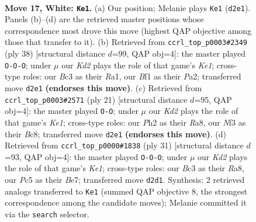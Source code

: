 \documentclass[11pt]{article}
\begin{document}
\clearpage

\begin{figure}[p]\centering
\begin{subfigure}{0.46\textwidth}\centering
\resizebox{\linewidth}{!}{%
\newchessgame
\chessboard[
  setfen={r1b2r2/p1ppqp2/2n1p2k/1QP3pp/4n3/2B2NP1/PP1KPP1P/R4B1R w - - 1 17},
  showmover=false,
  pgfstyle=straightmove, color=movearrow, markmove={d2-e1}
]}
\caption{}
\end{subfigure}\hfill
\begin{subfigure}{0.46\textwidth}\centering
\resizebox{\linewidth}{!}{%
\newchessgame
\chessboard[
  setfen={r1bqk2r/p1p5/3p1pn1/2pPp1n1/2P1P1Pp/2N2P1N/PP1QB2R/R3K3 w Qkq - 2 20},
  showmover=false,
  pgfstyle=straightmove, color=movearrow, markmove={e1-c1}
]}
\caption{}
\end{subfigure}
\\[4pt]
\begin{subfigure}{0.46\textwidth}\centering
\resizebox{\linewidth}{!}{%
\newchessgame
\chessboard[
  setfen={r1b1k2r/ppq1bppp/2p2n2/P3p1N1/2p1P3/2NP3P/1PP2PP1/R1BQ1RK1 b kq - 3 11},
  showmover=false,
  pgfstyle=straightmove, color=movearrow, markmove={e8-g8}
]}
\caption{}
\end{subfigure}\hfill
\begin{subfigure}{0.46\textwidth}\centering
\resizebox{\linewidth}{!}{%
\newchessgame
\chessboard[
  setfen={r3k2r/1pq1bpp1/p1b1pn2/2p1N3/2P2N1p/1P5P/P2P1PP1/R1BQR1K1 b kq - 3 16},
  showmover=false,
  pgfstyle=straightmove, color=movearrow, markmove={e8-c8}
]}
\caption{}
\end{subfigure}
\caption{\textbf{Move 17, White: \texttt{Ke1}.} (a) Our position; Melanie plays \texttt{Ke1} (\texttt{d2e1}). Panels (b)--(d) are the retrieved master positions whose correspondence most drove this move (highest QAP objective among those that transfer to it). (b) Retrieved from \texttt{ccrl\_top\_p0003\#2349} (ply 38) [structural distance $d$=99, QAP obj=4]: the master played \texttt{O-O-O}; under $\mu$ our \emph{Kd2} plays the role of that game's \emph{Ke1}; cross-type roles: our \emph{B}c3 as their \emph{R}a1, our \emph{B}f1 as their \emph{P}a2; transferred move \texttt{d2e1} \textbf{(endorses this move)}. (c) Retrieved from \texttt{ccrl\_top\_p0003\#2571} (ply 21) [structural distance $d$=95, QAP obj=4]: the master played \texttt{O-O}; under $\mu$ our \emph{Kd2} plays the role of that game's \emph{Ke1}; cross-type roles: our \emph{P}h2 as their \emph{R}a8, our \emph{N}f3 as their \emph{B}c8; transferred move \texttt{d2e1} \textbf{(endorses this move)}. (d) Retrieved from \texttt{ccrl\_top\_p0000\#1838} (ply 31) [structural distance $d$=93, QAP obj=4]: the master played \texttt{O-O-O}; under $\mu$ our \emph{Kd2} plays the role of that game's \emph{Ke1}; cross-type roles: our \emph{B}c3 as their \emph{R}a8, our \emph{P}c5 as their \emph{B}e7; transferred move \texttt{d2d1}. Synthesis: 2 retrieved analogs transferred to \texttt{Ke1} (summed QAP objective 8, the strongest correspondence among the candidate moves); Melanie committed it via the \texttt{search} selector.}
\label{fig:thought-m32}
\end{figure}
\end{document}
